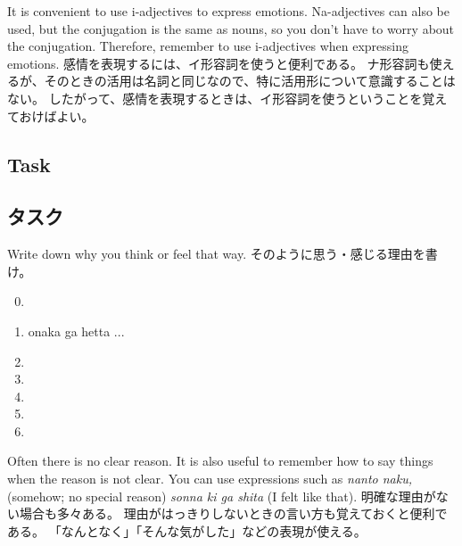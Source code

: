 \documentclass[uplatex,dvipdfmx,b5paper,english,10pt]{jsbook}
\begin{document}
\begin{toianswer}
\ifEnglish
It is convenient to use i-adjectives to express emotions.
Na-adjectives can also be used, but the conjugation is the same as nouns, so you don't have to worry about the conjugation.
Therefore, remember to use i-adjectives when expressing emotions.
\else
感情を表現するには、イ形容詞を使うと便利である。
ナ形容詞も使えるが、そのときの活用は名詞と同じなので、特に活用形について意識することはない。
したがって、感情を表現するときは、イ形容詞を使うということを覚えておけばよい。
\fi
\end{toianswer}


\ifEnglish
\subsection{Task}
\else
\subsection{タスク}
\fi

\begin{toiquestion}
\ifEnglish
Write down why you think or feel that way.
\else
そのように思う・感じる理由を書け。
\fi
\end{toiquestion}

\begin{multicols}{2}
\begin{enumerate}
 \setcounter{enumi}{-1}
 \item \hrulefill
 \vspace{-1.1\baselineskip}
 \item[] \hspace{3zw}onaka ga hetta ...
 \item \hrulefill
 \item \hrulefill
 \item \hrulefill
 \item \hrulefill
 \item \hrulefill
\end{enumerate}
\end{multicols}

\begin{toianswer}
\ifEnglish
Often there is no clear reason.
It is also useful to remember how to say things when the reason is not clear.
You can use expressions such as {\it nanto naku,\/} (somehow; no special reason) {\it sonna ki ga shita\/} (I felt like that).
\else
明確な理由がない場合も多々ある。
理由がはっきりしないときの言い方も覚えておくと便利である。
「なんとなく」「そんな気がした」などの表現が使える。
\fi
\end{toianswer}
\end{document}
